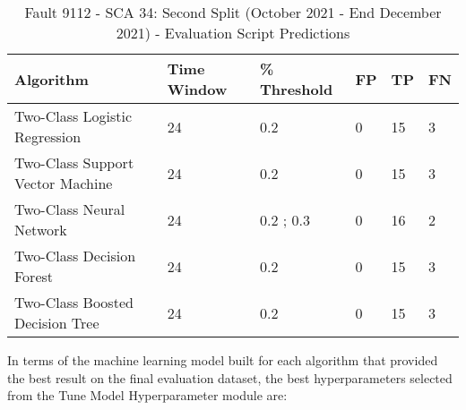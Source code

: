 \begin{table}[!ht]
    \centering
    \begin{tabular}{|l|l|l|l|l|l|}
    \hline
        Algorithm & Time Window & \% Threshold & FP & TP & FN \\ \hline
        Two-Class Logistic Regression & 24 & 0.2 & 0 & 15 & 3 \\ \hline
        Two-Class Support Vector Machine & 24 & 0.2 & 0 & 15 & 3 \\ \hline
        Two-Class Neural Network & 24 & 0.2 ; 0.3 & 0 & 16 & 2 \\ \hline
        Two-Class Decision Forest & 24 & 0.2 & 0 & 15 & 3 \\ \hline
        Two-Class Boosted Decision Tree & 24 & 0.2 & 0 & 15 & 3 \\ \hline
    \end{tabular}
	\caption{Fault 9112 - SCA 34: Second Split (October 2021 - End December 2021) - Evaluation Script Predictions}
    \label{9112_SCA34_3rd}
\end{table}

In terms of the machine learning model built for each algorithm that provided the best result on the final evaluation dataset, the best hyperparameters selected from the Tune Model Hyperparameter module are:

